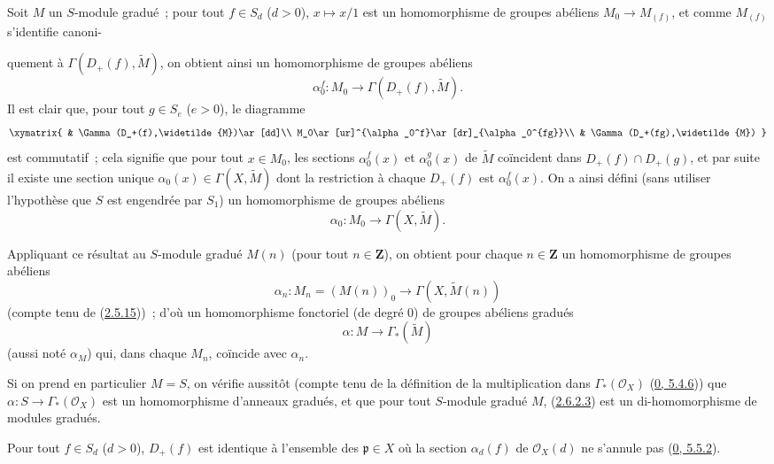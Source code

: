 \begin{env}[2.6.2]
\label{II.2.6.2-fr}
Soit $M$ un $S$-module gradué~; pour tout $f\in S_d$ ($d>0$),
$x\mapsto x/1$ est un homomorphisme de groupes abéliens
$M_0\to M_{(f)}$, et comme $M_{(f)}$ s'identifie canoni-


quement à $\Gamma(D_+(f),\widetilde{M})$, on obtient ainsi un
homomorphisme de groupes abéliens
\[
  \alpha_0^f:M_0\longrightarrow\Gamma(D_+(f),\widetilde{M}).
\]
Il est clair que, pour tout $g\in S_e$ ($e>0$), le diagramme
\[
  \xymatrix{
    & \Gamma(D_+(f),\widetilde{M})\ar[dd]\\
    M_0\ar[ur]^{\alpha_0^f}\ar[dr]_{\alpha_0^{fg}}\\
    & \Gamma(D_+(fg),\widetilde{M})
  }
\]
est commutatif~; cela signifie que pour tout $x\in M_0$, les sections
$\alpha_0^f(x)$ et $\alpha_0^g(x)$ de $\widetilde{M}$ coïncident dans
$D_+(f)\cap D_+(g)$, et par suite il existe une section unique
$\alpha_0(x)\in\Gamma(X,\widetilde{M})$ dont la restriction à chaque
$D_+(f)$ est $\alpha_0^f(x)$. On a ainsi défini (sans utiliser l'hypothèse
que $S$ est engendrée par $S_1$) un homomorphisme de groupes abéliens
\[
\label{II.2.6.2.1-fr}
  \alpha_0:M_0\longrightarrow\Gamma(X,\widetilde{M}).
\tag{2.6.2.1}
\]

Appliquant ce résultat au $S$-module gradué $M(n)$ (pour tout
$n\in\mathbf{Z}$), on obtient pour chaque $n\in\mathbf{Z}$ un homomorphisme
de groupes abéliens
\[
\label{II.2.6.2.2-fr}
  \alpha_n:M_n=(M(n))_0\longrightarrow\Gamma(X,\widetilde{M}(n))
\tag{2.6.2.2}
\]
(compte tenu de (\hyperref[II.2.5.15-fr]{2.5.15}))~; d'où un homomorphisme
fonctoriel (de degré $0$) de groupes abéliens gradués
\[
\label{II.2.6.2.3-fr}
  \alpha:M\longrightarrow\Gamma_*(\widetilde{M})
\tag{2.6.2.3}
\]
(aussi noté $\alpha_M$) qui, dans chaque $M_n$, coïncide avec $\alpha_n$.

Si on prend en particulier $M=S$, on vérifie aussitôt (compte tenu de la
définition de la multiplication dans $\Gamma_*(\mathcal{O}_X)$
(\hyperref[0.5.4.6-fr]{0, 5.4.6})) que
$\alpha:S\to\Gamma_*(\mathcal{O}_X)$ est un homomorphisme d'anneaux
gradués, et que pour tout $S$-module gradué $M$,
(\hyperref[II.2.6.2.3-fr]{2.6.2.3}) est un di-homomorphisme de modules
gradués.
\end{env}

\begin{proposition}[2.6.3]
\label{II.2.6.3-fr}
Pour tout $f\in S_d$ ($d>0$), $D_+(f)$ est identique à l'ensemble des
$\mathfrak{p}\in X$ où la section $\alpha_d(f)$ de $\mathcal{O}_X(d)$ ne
s'annule pas (\hyperref[0.5.5.2-fr]{0, 5.5.2}).
\end{proposition}


